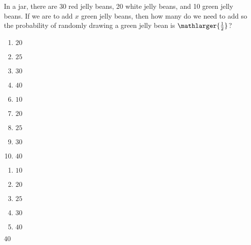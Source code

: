 



 In a jar, there are 30 red jelly beans, 20 white jelly beans, and 10 green jelly beans.  If we are to add $x$ green jelly beans, then how many do we need to add so the probability of randomly drawing a green jelly bean is $\mathlarger{\frac{1}{2}}$?



\ifsat
	\begin{enumerate}[label=\Alph*)]
		\item    $20$ 
		\item  $25$
		\item  $30$
		\item  $40$%
	\end{enumerate}
\else
\fi

\ifacteven
	\begin{enumerate}[label=\textbf{\Alph*.},itemsep=\fill,align=left]
		\setcounter{enumii}{5}
		\item    $10$
		\item    $20$ 
		\item  $25$
		\addtocounter{enumii}{1}
		\item  $30$
		\item  $40$%
	\end{enumerate}
\else
\fi

\ifactodd
	\begin{enumerate}[label=\textbf{\Alph*.},itemsep=\fill,align=left]
		\item    $10$
		\item    $20$ 
		\item  $25$
		\item  $30$
		\item  $40$%
	\end{enumerate}
\else
\fi

\ifgridin
  $40$%

\else
\fi

